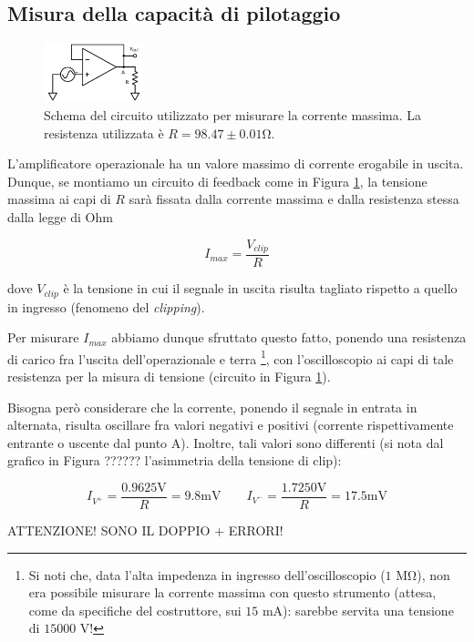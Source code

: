 \subsection{Misura della capacità di pilotaggio}

\begin{figure}
  \begin{center}
    \includegraphics[width=0.26\textwidth]{../E03/latex/max_current.pdf}
  \end{center}
  \caption{Schema del circuito utilizzato per misurare la corrente massima. La resistenza utilizzata è $R=98.47\pm0.01$\si{\ohm}.}
  \label{cir3:max_current}
\end{figure}

L'amplificatore operazionale ha un valore massimo di corrente erogabile in uscita. Dunque, se montiamo un circuito di feedback come in Figura \ref{cir3:max_current}, la tensione massima ai capi di $R$ sarà fissata dalla corrente massima e dalla resistenza stessa dalla legge di Ohm

$$I_{max} = \frac{V_{clip}}{R}$$

dove $V_{clip}$ è la tensione in cui il segnale in uscita risulta tagliato rispetto a quello in ingresso (fenomeno del \textit{clipping}).

Per misurare $I_{max}$ abbiamo dunque sfruttato questo fatto, ponendo una resistenza di carico fra l'uscita dell'operazionale e terra \footnote{Si noti che, data l'alta impedenza in ingresso dell'oscilloscopio ($1$ \si{\mega\ohm}), non era possibile misurare la corrente massima con questo strumento (attesa, come da specifiche del costruttore, sui $15$ \si{\milli\ampere}): sarebbe servita una tensione di $15000$ \si{\volt}!}, con l'oscilloscopio ai capi di tale resistenza per la misura di tensione (circuito in Figura \ref{cir3:max_current}).

Bisogna però considerare che la corrente, ponendo il segnale in entrata in alternata, risulta oscillare fra valori negativi e positivi (corrente rispettivamente entrante o uscente dal punto A). Inoltre, tali valori sono differenti (si nota dal grafico in Figura ?????? l'asimmetria della tensione di clip):

$$I_{V^+} = \frac{0.9625 \si{\volt}}{R} = 9.8 \si{\milli\volt}  \qquad I_{V^-} = \frac{1.7250 \si{\volt}}{R} = 17.5 \si{\milli\volt}$$

ATTENZIONE! SONO IL DOPPIO + ERRORI!